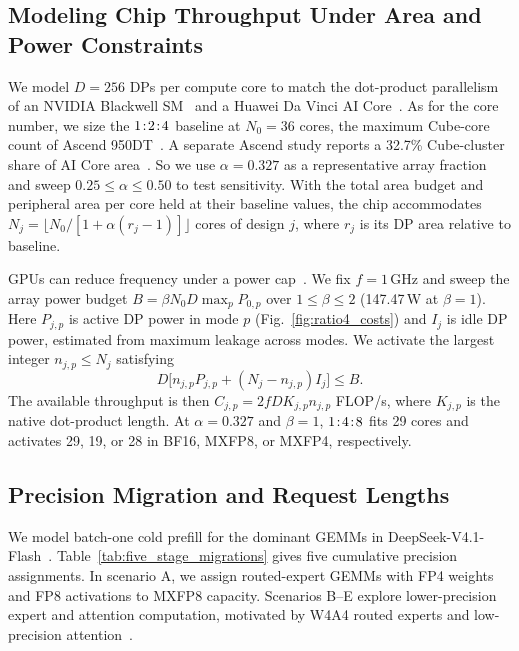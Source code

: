 \documentclass[conference,10pt,letterpaper]{IEEEtran}
\DeclareRobustCommand{\tpratio}[3]{\ensuremath{#1\mkern2mu{:}\mkern2mu#2\mkern2mu{:}\mkern2mu#3}}
\begin{document}
\subsection{Modeling Chip Throughput Under Area and Power Constraints}
We model $D=256$ DPs per compute core to match the dot-product parallelism of an NVIDIA Blackwell SM~\cite{nvidia2025blackwellbrief,tirumala2024blackwell} and a Huawei Da Vinci AI Core~\cite{liao2019davinci}. As for the core number, we size the \tpratio{1}{2}{4} baseline at $N_0=36$ cores, the maximum Cube-core count of Ascend 950DT~\cite{huawei950}. A separate Ascend study reports a 32.7\% Cube-cluster share of AI Core area~\cite{luo2024hifloat8area}. So we use $\alpha=0.327$ as a representative array fraction and sweep $0.25\le\alpha\le0.50$ to test sensitivity. With the total area budget and peripheral area per core held at their baseline values, the chip accommodates $N_j=\lfloor N_0/[1+\alpha(r_j-1)]\rfloor$ cores of design $j$, where $r_j$ is its DP area relative to baseline.

GPUs can reduce frequency under a power cap~\cite{nvidia2024nvmlpower}. We fix $f=1$\,GHz and sweep the array power budget $B=\beta N_0D\max_p P_{0,p}$ over $1\le\beta\le2$ (147.47\,W at $\beta=1$). Here $P_{j,p}$ is active DP power in mode $p$ (Fig.~\ref{fig:ratio4_costs}) and $I_j$ is idle DP power, estimated from maximum leakage across modes. We activate the largest integer $n_{j,p}\le N_j$ satisfying
\begin{equation}
D\big[n_{j,p}P_{j,p}+(N_j-n_{j,p})I_j\big]\le B .
\label{eq:active_core_budget}
\end{equation}
The available throughput is then $C_{j,p}=2fD K_{j,p}n_{j,p}$ FLOP/s, where $K_{j,p}$ is the native dot-product length. At $\alpha=0.327$ and $\beta=1$, \tpratio{1}{4}{8} fits 29 cores and activates 29, 19, or 28 in BF16, MXFP8, or MXFP4, respectively.

\subsection{Precision Migration and Request Lengths}
We model batch-one cold prefill for the dominant GEMMs in DeepSeek-V4.1-Flash~\cite{deepseekv41source}. Table~\ref{tab:five_stage_migrations} gives five cumulative precision assignments. In scenario A, we assign routed-expert GEMMs with FP4 weights and FP8 activations to MXFP8 capacity. Scenarios B--E explore lower-precision expert and attention computation, motivated by W4A4 routed experts and low-precision attention~\cite{nvidiav41routed2026,flashattention3,sageattention3}.

\end{document}

